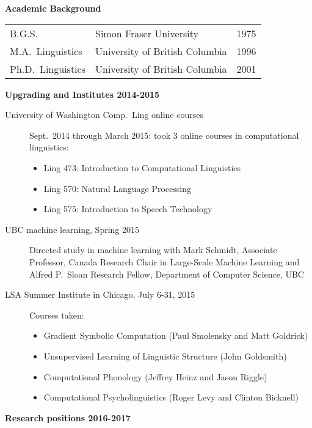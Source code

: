 \documentclass[11pt]{article}
\newcommand{\ii}{\item}
\begin{document}
\noindent \textbf{Academic Background}

\medskip

\begin{tabular}{lll}


B.G.S.\  & Simon Fraser University  &     1975 \\

M.A.\,  Linguistics  &   University of British Columbia  &   1996 \\

Ph.D.\, Linguistics &  University of British Columbia &    2001\\
\end{tabular}


\medskip


\noindent \textbf{Upgrading and Institutes 2014-2015}

\begin{description}
\ii[University of Washington Comp.\ Ling online courses]
Sept.\ 2014 through March 2015: took 3 online courses in computational linguistics:

\begin{itemize}
\ii[] Ling 473: Introduction to Computational Linguistics
\ii[] Ling 570: Natural Language Processing
\ii[] Ling 575: Introduction to Speech Technology
\end{itemize}

\ii[UBC machine learning, Spring 2015] Directed study in machine learning with Mark Schmidt, Associate Professor, Canada Research Chair in Large-Scale Machine Learning and Alfred P.\ Sloan Research Fellow, Department of Computer Science, UBC

\ii[LSA Summer Institute in Chicago, July 6-31, 2015]  Courses taken:

\begin{itemize}
\ii[] Gradient Symbolic Computation (Paul Smolensky and Matt Goldrick)
 \ii[] Unsupervised Learning of Linguistic Structure (John Goldsmith)
\ii[] Computational Phonology (Jeffrey Heinz and Jason Riggle)
\ii[] Computational Psycholinguistics (Roger Levy and Clinton Bicknell)
\end{itemize}
\end{description}

\noindent \textbf{Research positions 2016-2017}
\end{document}
